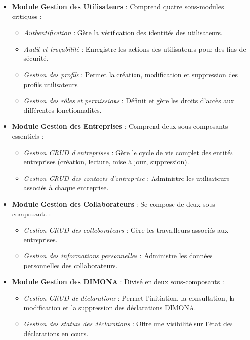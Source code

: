 \begin{itemize}[leftmargin=*,label=\textcolor{darkgray}{$\bullet$},itemsep=0.3em]
  \item \textbf{Module Gestion des Utilisateurs} : Comprend quatre sous-modules critiques :
    \begin{itemize}[leftmargin=*,label=\textcolor{darkgray}{$\bullet$},itemsep=0.3em]
      \item \textit{Authentification} : Gère la vérification des identités des utilisateurs.
      \item \textit{Audit et traçabilité} : Enregistre les actions des utilisateurs pour des fins de sécurité.
      \item \textit{Gestion des profils} : Permet la création, modification et suppression des profils utilisateurs.
      \item \textit{Gestion des rôles et permissions} : Définit et gère les droits d'accès aux différentes fonctionnalités.
    \end{itemize}
  
  \item \textbf{Module Gestion des Entreprises} : Comprend deux sous-composants essentiels :
    \begin{itemize}[leftmargin=*,label=\textcolor{darkgray}{$\bullet$},itemsep=0.3em]
      \item \textit{Gestion CRUD d'entreprises} : Gère le cycle de vie complet des entités entreprises (création, lecture, mise à jour, suppression).
      \item \textit{Gestion CRUD des contacts d'entreprise} : Administre les utilisateurs associés à chaque entreprise.
    \end{itemize}
  
  \item \textbf{Module Gestion des Collaborateurs} : Se compose de deux sous-composants :
    \begin{itemize}[leftmargin=*,label=\textcolor{darkgray}{$\bullet$},itemsep=0.3em]
      \item \textit{Gestion CRUD des collaborateurs} : Gère les travailleurs associés aux entreprises.
      \item \textit{Gestion des informations personnelles} : Administre les données personnelles des collaborateurs.
    \end{itemize}
  
  \item \textbf{Module Gestion des DIMONA} : Divisé en deux sous-composants :
    \begin{itemize}[leftmargin=*,label=\textcolor{darkgray}{$\bullet$},itemsep=0.3em]
      \item \textit{Gestion CRUD de déclarations} : Permet l'initiation, la consultation, la modification et la suppression des déclarations DIMONA.
      \item \textit{Gestion des statuts des déclarations} : Offre une visibilité sur l'état des déclarations en cours.
    \end{itemize}
    

\end{itemize}
